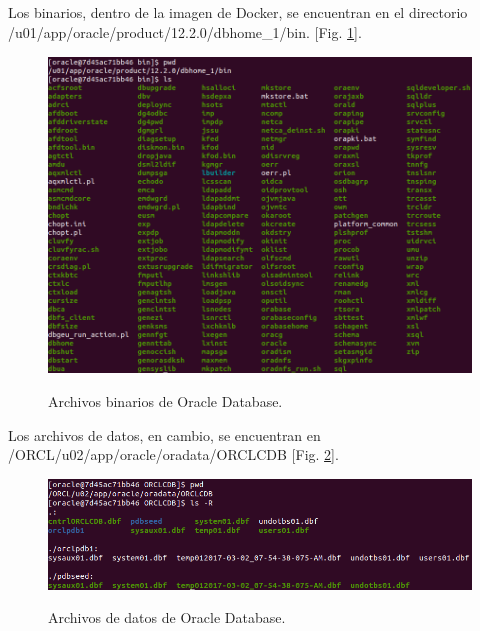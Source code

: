 \documentclass[10pt,a4paper]{article}
\begin{document}
\subsection{}
Los binarios, dentro de la imagen de Docker, se encuentran en el directorio \\
/u01/app/oracle/product/12.2.0/dbhome\_1/bin. [Fig. \ref{fig:oracle_bin}].
\begin{figure}[h!]
  \centering
  \includegraphics[scale=0.4]{bin.png}\\
  \caption{Archivos binarios de Oracle Database.}
  \label{fig:oracle_bin}
\end{figure}

Los archivos de datos, en cambio, se encuentran en /ORCL/u02/app/oracle/oradata/ORCLCDB \cite{datafiles} [Fig. \ref{fig:oracle_data}].
\begin{figure}[h!]
  \centering
  \includegraphics[scale=0.4]{data.png}\\
  \caption{Archivos de datos de Oracle Database.}
  \label{fig:oracle_data}
\end{figure}

\pagebreak
\end{document}
